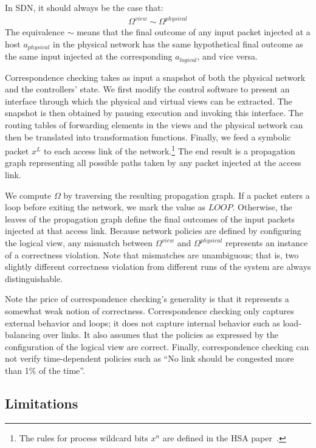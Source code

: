 In SDN, it should always be the case that:
\begin{align*}
\Omega^{view} \sim \Omega^{physical}
\end{align*}
The equivalence $\sim$ means that the final outcome of any input packet
injected at a host $a_{physical}$ in the physical network has the same hypothetical final outcome as
the same input injected at the corresponding $a_{logical}$, and vice versa.

Correspondence checking takes as input a
snapshot of both the physical network and the
controllers' state. We first modify the control software to present an
interface through which the physical and virtual views can be
extracted. The snapshot is
then obtained by pausing execution and invoking this interface.
The routing tables of forwarding elements in the views and the physical
network can then be translated into transformation functions.
Finally, we feed a symbolic packet $x^L$ to each access link of the
network.\footnote{The rules for process wildcard bits $x^n$ are defined in
the HSA paper~\cite{hsa}.} The end result is a propagation graph representing
all possible paths taken by any packet injected
at the access link.

We compute $\Omega$ by traversing the resulting propagation graph. If a packet
enters a loop before exiting the network, we mark the value as
$LOOP$. Otherwise,
the leaves of the propagation graph define the final outcomes of the input
packets injected at that access link. Because network policies are defined by
configuring the logical view, any mismatch between $\Omega^{view}$ and $\Omega^{physical}$
represents an instance of a correctness violation. Note that mismatches are
unambiguous; that is, two slightly different correctness violation from
different runs of the system are always distinguishable.

Note the price of correspondence checking's generality is that it represents
a somewhat weak notion of
correctness. Correspondence checking only captures external behavior and
loops; it does not capture internal behavior such as load-balancing
over links. It also assumes that the policies as expressed by the
configuration of the logical view are correct. Finally, correspondence
checking can not verify
time-dependent policies such as ``No link should be congested more than 1\% of
the time''.

\subsection{Limitations}
\label{subsec:non_goals}

